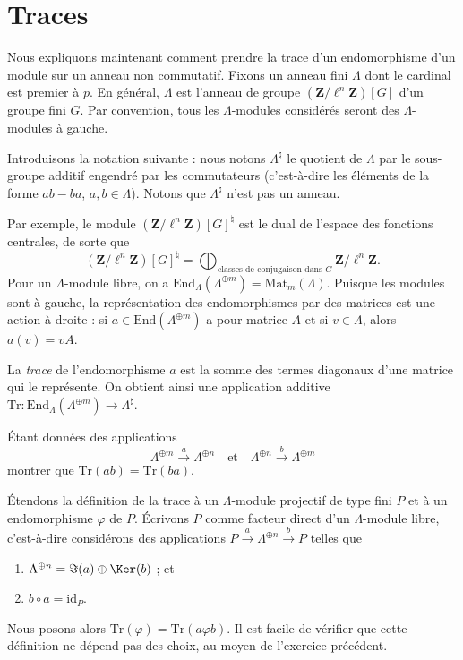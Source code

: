 \section{Traces}
\label{section-traces}

\noindent
Nous expliquons maintenant comment prendre la trace d'un endomorphisme d'un module sur un
anneau non commutatif. Fixons un anneau fini $\Lambda$ dont le cardinal est premier à $p$.
En général, $\Lambda$ est l'anneau de groupe $(\mathbf{Z}/\ell^n\mathbf{Z})[G]$ d'un
groupe fini $G$. Par convention, tous les $\Lambda$-modules considérés
seront des $\Lambda$-modules à gauche.

\medskip\noindent
Introduisons la notation suivante :
nous notons $\Lambda^\natural$ le quotient de $\Lambda$ par le sous-groupe additif
engendré par les commutateurs (c'est-à-dire les éléments de la forme
$ab-ba$, $a, b \in \Lambda$). Notons que $\Lambda^\natural$ n'est pas un anneau.

\medskip\noindent
Par exemple, le module $(\mathbf{Z}/\ell^n\mathbf{Z})[G]^\natural$ est le
dual de l'espace des fonctions centrales, de sorte que
$$
(\mathbf{Z}/\ell^n\mathbf{Z})[G]^\natural
=
\bigoplus\nolimits_{\text{classes de conjugaison dans }G}
\mathbf{Z}/\ell^n\mathbf{Z}.
$$
Pour un $\Lambda$-module libre, on a $\text{End}_\Lambda(\Lambda^{\oplus m}) =
\text{Mat}_m(\Lambda)$. Puisque les modules sont à gauche,
la représentation des endomorphismes par des matrices est une action à droite : si $a \in
\text{End}(\Lambda^{\oplus m})$ a pour matrice $A$ et si $v \in \Lambda$, alors $a(v)
= v A$.

\begin{definition}
\label{definition-trace}
La {\it trace} de l'endomorphisme $a$ est la somme des termes diagonaux d'une
matrice qui le représente. On obtient ainsi une application additive $\text{Tr} :
\text{End}_\Lambda(\Lambda^{\oplus m}) \to \Lambda^\natural$.
\end{definition}

\begin{exercise}
\label{exercise-trace-is-trace}
Étant données des applications
$$
\Lambda^{\oplus m} \xrightarrow{a} \Lambda^{\oplus n}
\quad\text{et}\quad
\Lambda^{\oplus n} \xrightarrow{b} \Lambda^{\oplus m}
$$
montrer que $\text{Tr}(ab) = \text{Tr}(ba)$.
\end{exercise}

\noindent
Étendons la définition de la trace à un $\Lambda$-module projectif de type fini
$P$ et à un endomorphisme $\varphi$ de $P$. Écrivons $P$ comme facteur direct
d'un $\Lambda$-module libre, c'est-à-dire considérons des applications $P \xrightarrow{a}
\Lambda^{\oplus n} \xrightarrow{b} P$ telles que
\begin{enumerate}
\item
$\Lambda^{\oplus n} = \Im(a) \oplus \Ker(b)$ ; et
\item
$b\circ a = \text{id}_P$.
\end{enumerate}
Nous posons alors $\text{Tr}(\varphi) = \text{Tr}(a\varphi b)$. Il est facile de vérifier
que cette définition ne dépend pas des choix, au moyen de l'exercice précédent.








